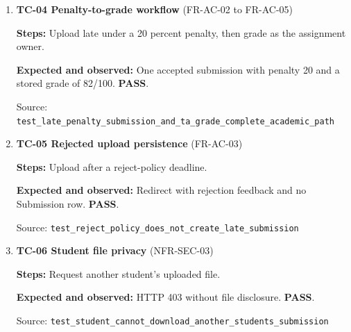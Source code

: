 \begin{enumerate}
\begin{minipage}[t]{\linewidth}
\textbf{Expected and observed:} First request adds completion, second removes it. This is a toggle, not HTTP retry idempotency. \textbf{PASS}.\par

{\footnotesize Source: \nolinkurl{test_student_checklist_completion_is_idempotent_toggle}}\end{minipage}

\item \begin{minipage}[t]{\linewidth}\textbf{TC-04 Penalty-to-grade workflow } (FR-AC-02 to FR-AC-05)\par

\textbf{Steps:} Upload late under a 20 percent penalty, then grade as the assignment owner.\par

\textbf{Expected and observed:} One accepted submission with penalty 20 and a stored grade of 82/100. \textbf{PASS}.\par

{\footnotesize Source: \nolinkurl{test_late_penalty_submission_and_ta_grade_complete_academic_path}}\end{minipage}

\item \begin{minipage}[t]{\linewidth}\textbf{TC-05 Rejected upload persistence } (FR-AC-03)\par

\textbf{Steps:} Upload after a reject-policy deadline.\par

\textbf{Expected and observed:} Redirect with rejection feedback and no Submission row. \textbf{PASS}.\par

{\footnotesize Source: \nolinkurl{test_reject_policy_does_not_create_late_submission}}\end{minipage}

\item \begin{minipage}[t]{\linewidth}\textbf{TC-06 Student file privacy } (NFR-SEC-03)\par

\textbf{Steps:} Request another student's uploaded file.\par

\textbf{Expected and observed:} HTTP 403 without file disclosure. \textbf{PASS}.\par

{\footnotesize Source: \nolinkurl{test_student_cannot_download_another_students_submission}}\end{minipage}


\end{enumerate}
